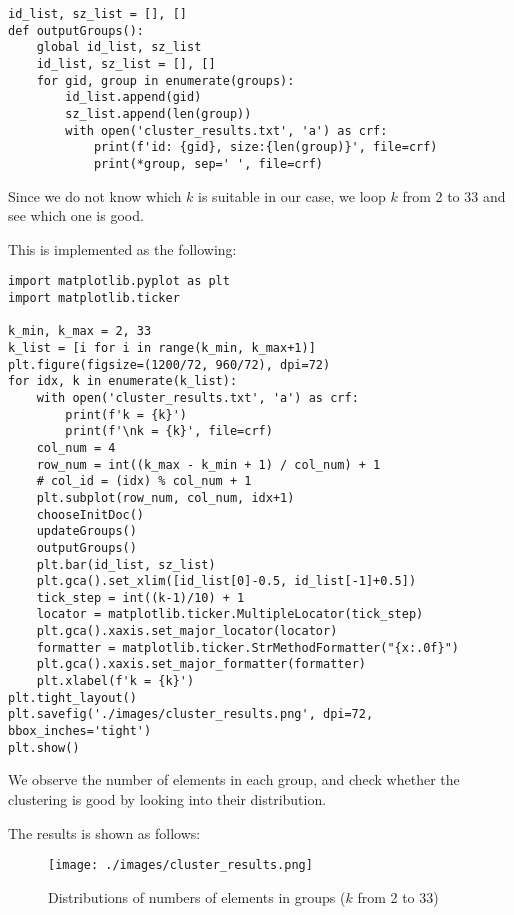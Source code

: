 \documentclass[a4paper, 12pt]{article}
\begin{document}
\begin{lstlisting}[style=myPython,caption={Output information of final groups}]
id_list, sz_list = [], []
def outputGroups():
    global id_list, sz_list
    id_list, sz_list = [], []
    for gid, group in enumerate(groups):
        id_list.append(gid)
        sz_list.append(len(group))
        with open('cluster_results.txt', 'a') as crf:
            print(f'id: {gid}, size:{len(group)}', file=crf)
            print(*group, sep=' ', file=crf)
\end{lstlisting}

Since we do not know which $k$ is suitable in our case, we loop $k$ from 2 to 33 and see which one is good.

This is implemented as the following:

\begin{lstlisting}[style=myPython,caption={Loop $k$ and visualize the results of clustering}]
import matplotlib.pyplot as plt
import matplotlib.ticker

k_min, k_max = 2, 33
k_list = [i for i in range(k_min, k_max+1)]
plt.figure(figsize=(1200/72, 960/72), dpi=72)
for idx, k in enumerate(k_list):
    with open('cluster_results.txt', 'a') as crf:
        print(f'k = {k}')
        print(f'\nk = {k}', file=crf)
    col_num = 4
    row_num = int((k_max - k_min + 1) / col_num) + 1
    # col_id = (idx) % col_num + 1
    plt.subplot(row_num, col_num, idx+1)
    chooseInitDoc()
    updateGroups()
    outputGroups()
    plt.bar(id_list, sz_list)
    plt.gca().set_xlim([id_list[0]-0.5, id_list[-1]+0.5])
    tick_step = int((k-1)/10) + 1
    locator = matplotlib.ticker.MultipleLocator(tick_step)
    plt.gca().xaxis.set_major_locator(locator)
    formatter = matplotlib.ticker.StrMethodFormatter("{x:.0f}")
    plt.gca().xaxis.set_major_formatter(formatter)
    plt.xlabel(f'k = {k}')
plt.tight_layout()
plt.savefig('./images/cluster_results.png', dpi=72, bbox_inches='tight')
plt.show()
\end{lstlisting}

We observe the number of elements in each group, and check whether the clustering is good by looking into their distribution.

The results is shown as follows:

\begin{figure}[htbp]
\centering
\texttt{[image: ./images/cluster\_results.png]}
\caption{Distributions of numbers of elements in groups ($k$ from 2 to 33)}
\end{figure}
\end{document}
